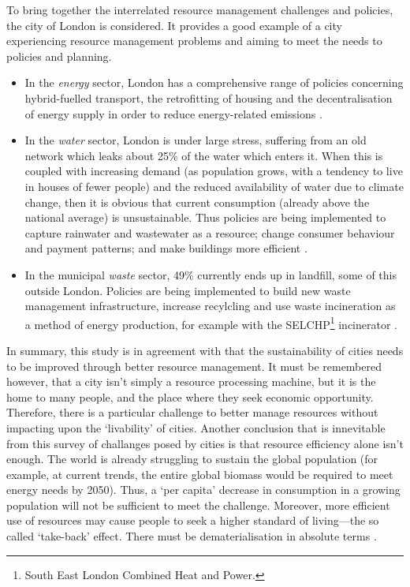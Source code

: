 To bring together the interrelated resource management challenges and policies, the city of London is considered. It provides a good example of a city experiencing resource management problems and aiming to meet the needs to policies and planning. 
\begin{itemize}
	\item In the \emph{energy} sector, London has a comprehensive range of policies concerning hybrid-fuelled transport, the retrofitting of housing and the decentralisation of energy supply in order to reduce energy-related emissions \citep{Strategy2011}. 
	\item In the \emph{water} sector, London is under large stress, suffering from an old network which leaks about 25\% of the water which enters it. When this is coupled with increasing demand (as population grows, with a tendency to live in houses of fewer people) and the reduced availability of water due to climate change, then it is obvious that current consumption (already above the national average) is unsustainable. Thus policies are being implemented to capture rainwater and wastewater as a resource; change consumer behaviour and payment patterns; and make buildings more efficient \citep{Nickson2011}. 
	\item In the municipal \emph{waste} sector, 49\% currently ends up in landfill, some of this outside London. Policies are being implemented to build new waste management infrastructure, increase recylcling and use waste incineration as a method of energy production, for example with the SELCHP\footnote{South East London Combined Heat and Power.} incinerator \citep{Zabal2011}.
\end{itemize}

In summary, this study is in agreement with \citet{Newman1999} that the sustainability of cities needs to be improved through better resource management. It must be remembered however, that a city isn't simply a resource processing machine, but it is the home to many people, and the place where they seek economic opportunity.  Therefore, there is a particular challenge to better manage resources without impacting upon the `livability' of cities. Another conclusion that is innevitable from this survey of challanges posed by cities is that resource efficiency alone isn't enough. The world is already struggling to sustain the global population (for example, at current trends, the entire global biomass would be required to meet energy needs by 2050). Thus, a `per capita' decrease in consumption in a growing population will not be sufficient to meet the challenge. Moreover, more efficient use of resources may cause people to seek a higher standard of living---the so called `take-back' effect. There must be dematerialisation in absolute terms \citep{Winiwarter2011}.

